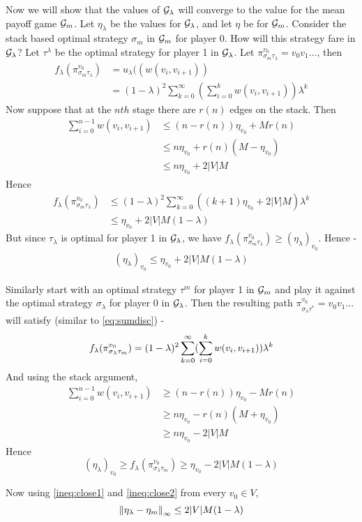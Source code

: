 Now we will show that the values of $\mathcal{G}_\lambda$ will converge to the value for the mean payoff game $\mathcal{G}_m$. Let $\eta_\lambda$ be the values for $\mathcal{G}_\lambda$, and let $\eta$ be for $\mathcal{G}_m$. Consider the stack based optimal strategy $\sigma_m$ in $\mathcal{G}_m$ for player 0. How will this strategy fare in $\mathcal{G}_\lambda$? Let $\tau^\lambda$ be the optimal strategy for player 1 in $\mathcal{G}_\lambda$. Let $\pi^{v_0}_{\sigma_m\tau_\lambda}=v_0v_1 \ldots$, then
\begin{align}
    f_\lambda(\pi^{v_0}_{\sigma_m\tau_\lambda}) &= u_\lambda((w(v_i,v_{i+1}))\\
    &= (1-\lambda)^2 \sum_{k=0}^\infty (\sum_{i=0}^k w(v_i,v_{i+1})) \lambda^k \label{eq:sumdisc}
\end{align}
Now suppose that at the $nth$ stage there are $r(n)$ edges on the stack. Then
\begin{align}
    \sum_{i=0}^{n-1} w(v_i,v_{i+1}) &\leq (n-r(n)) \eta_{v_0} + M r(n)\\
    &\leq n \eta_{v_0} + r(n)(M-\eta_{v_0})\\
    &\leq n \eta_{v_0} + 2|V|M
\end{align}
Hence
\begin{align}
    f_\lambda(\pi^{v_0}_{\sigma_m\tau_\lambda}) &\leq (1-\lambda)^2 \sum_{k=0}^\infty ((k+1)\eta_{v_0} + 2|V|M)\lambda^k\\
    &\leq \eta_{v_0} + 2|V|M (1-\lambda)
\end{align}
But since $\tau_\lambda$ is optimal for player 1 in $\mathcal{G}_\lambda$, we have $f_\lambda(\pi^{v_0}_{\sigma_m\tau_\lambda}) \geq (\eta_\lambda)_{v_0}$. Hence -
\begin{align}
    (\eta_\lambda)_{v_0} \leq \eta_{v_0} + 2|V|M (1-\lambda) \label{ineq:close1}
\end{align}

Similarly start with an optimal strategy $\tau^m$ for player 1 in $\mathcal{G}_m$ and play it against the optimal strategy $\sigma_\lambda$ for player 0 in $\mathcal{G}_\lambda$. Then the resulting path $\pi^{v_0}_{\sigma_\lambda\tau^*}=v_0v_1\ldots$ will satisfy (similar to \eqref{eq:sumdisc}) -
\[
    f_\lambda(\pi^{v_0}_{\sigma_\lambda\tau_m}) = (1-\lambda)^2 \sum_{k=0}^\infty (\sum_{i=0}^k w(v_i,v_{i+1})) \lambda^k  \\
\]
And using the stack argument,
\begin{align}
    \sum_{i=0}^{n-1} w(v_i,v_{i+1}) &\geq (n-r(n)) \eta_{v_0} - M r(n)\\
    &\geq n \eta_{v_0} - r(n)(M+\eta_{v_0})\\
    &\geq n \eta_{v_0} - 2|V|M
\end{align}
Hence
\begin{equation}
    (\eta_\lambda)_{v_0} \geq f_\lambda(\pi^{v_0}_{\sigma_\lambda\tau_m}) \geq \eta_{v_0} - 2|V|M (1-\lambda) \label{ineq:close2}
\end{equation}

Now using \eqref{ineq:close1} and \eqref{ineq:close2} from every $v_0 \in V$,
\begin{equation}
    \left\lVert\eta_\lambda - \eta_m\right\rVert_\infty \leq 2|V|M(1-\lambda)
\end{equation}
